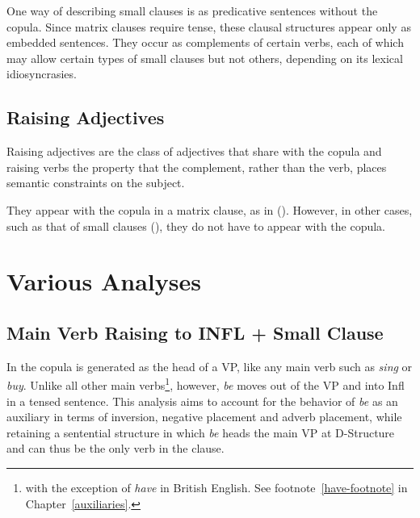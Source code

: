 {One way of describing small clauses is as predicative sentences without the
copula.  Since matrix clauses require tense, these clausal structures appear
only as embedded sentences.  They occur as complements of certain verbs, each
of which may allow certain types of small clauses but not others, depending on its
lexical idiosyncrasies.




\subsection{Raising Adjectives}
\label{raising-adjs}

Raising adjectives are the class of adjectives that 
share with the copula and raising verbs the property
that the complement, rather than the verb, places semantic constraints on
the subject.  

They appear with the copula in a matrix clause, as in ({}).  However,
in other cases, such as that of small clauses ({}), they do not
have to appear with the copula.





\section{Various Analyses}
\label{sm-clause-other-analyses}

\subsection{Main Verb Raising to INFL + Small Clause}

In \cite{pollack89} the copula is generated as the head of a VP, like any main
verb such as {\it sing} or {\it buy}. Unlike all other main verbs\footnote{with
the exception of {\it have} in British English. See
footnote~\ref{have-footnote} in Chapter~\ref{auxiliaries}.}, however, {\it be}
moves out of the VP and into Infl in a tensed sentence.  This analysis aims to
account for the behavior of {\it be} as an auxiliary in terms of inversion,
negative placement and adverb placement, while retaining a sentential structure
in which {\it be} heads the main VP at D-Structure and can thus be the only
verb in the clause.

}
